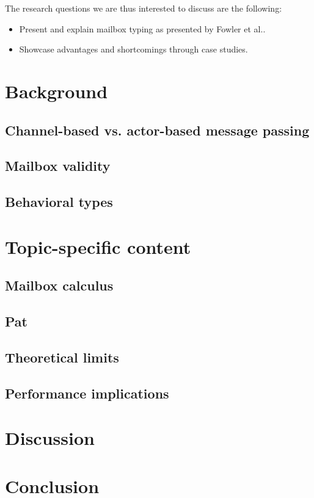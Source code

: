The research questions we are thus interested to discuss are the following:
\begin{itemize}
    \item Present and explain mailbox typing as presented by Fowler et al.\cite{fowlerSpecialDeliveryProgramming2023}.
    \item Showcase advantages and shortcomings through case studies.
\end{itemize}


\section{Background}
\label{sec:background}

\subsection{Channel-based vs. actor-based message passing}


\subsection{Mailbox validity}


\subsection{Behavioral types}


\section{Topic-specific content}
\label{sec:contentSummary}

\subsection{Mailbox calculus}

\subsection{Pat}

\subsection{Theoretical limits}

\subsection{Performance implications}





\section{Discussion}
\label{sec:discussion}




\section{Conclusion}
\label{sec:conclusions}



